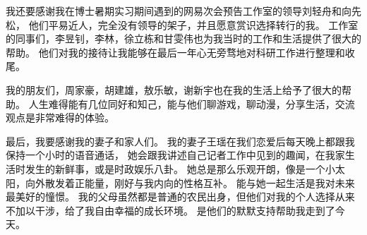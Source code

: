 我还要感谢我在博士暑期实习期间遇到的网易次会预告工作室的领导刘轻舟和向先松，
他们平易近人，完全没有领导的架子，并且愿意赏识选择转行的我。
工作室的同事们，李昱钊，李林，徐立栋和甘雯伟也为我当时的工作和生活提供了很大的帮助。
他们对我的接待让我能够在最后一年心无旁骛地对科研工作进行整理和收尾。

我的朋友们，周家豪，胡建雄，敖乐敏，谢新宇也在我的生活上给予了很大的帮助。
人生难得能有几位同好和知己，能与他们聊游戏，聊动漫，分享生活，交流观点是非常难得的体验。

最后，我要感谢我的妻子和家人们。
我的妻子王瑶在我们恋爱后每天晚上都跟我保持一个小时的语音通话，
她会跟我讲述自己记者工作中见到的趣闻，在我家生活时发生的新鲜事，或是时政娱乐八卦。
她总是那么乐观开朗，像是一个小太阳，向外散发着正能量，刚好与我内向的性格互补。
能与她一起生活是我对未来最美好的憧憬。
我的父母虽然都是普通的农民出身，但他们对我的个人选择从来不加以干涉，给了我自由幸福的成长环境。
是他们的默默支持帮助我走到了今天。
